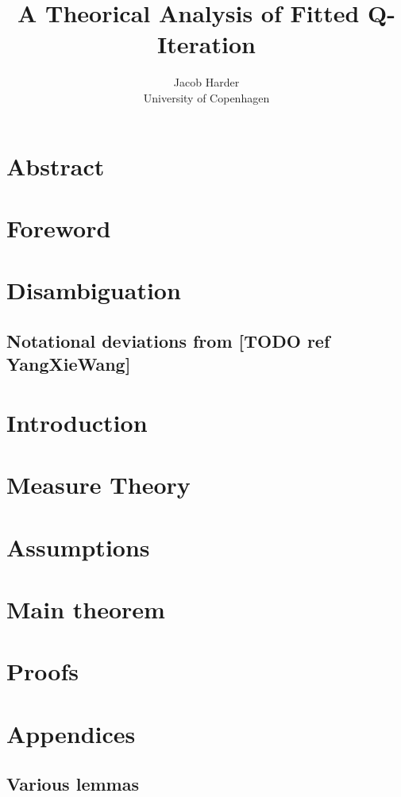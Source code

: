\documentclass{article}
\title{A Theorical Analysis of Fitted Q-Iteration}
\author{Jacob Harder \\ University of Copenhagen}
\begin{document}
\maketitle

\section{Abstract}

\section{Foreword}


\section{Disambiguation}


\subsection{Notational deviations from [TODO ref YangXieWang]}


\section{Introduction}


\section{Measure Theory}


\section{Assumptions}


\section{Main theorem}


\section{Proofs}












\section{Appendices}
\subsection{Various lemmas}


\end{document}
